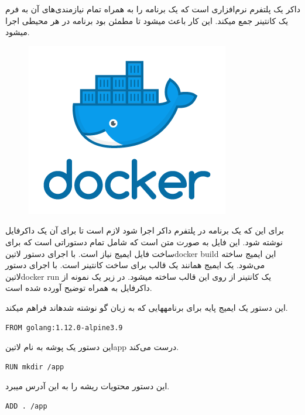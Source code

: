 \documentclass[a4]{report}
\begin{document}
داکر یک پلتفرم نرم‌افزاری است که یک برنامه را به همراه تمام نیازمندی‌های آن به فرم یک کانتینر جمع
میکند. این کار باعث میشود تا مطمئن بود برنامه در هر محیطی اجرا میشود.

\begin{figure}
\centering
\includegraphics[scale=0.25]{fig/docker}
\end{figure}

برای این که یک برنامه در پلتفرم داکر اجرا شود لازم است تا برای آن یک داکرفایل
نوشته شود. این فایل به صورت متن است که شامل تمام دستوراتی است که برای ساخت فایل ایمیج نیاز است. با اجرای دستور ‌لاتین{docker build} این ایمیج ساخته می‌شود. یک ایمیج همانند یک قالب برای ساخت کانتینر است. با اجرای دستور ‌لاتین{docker run} یک کانتینر از روی این قالب ساخته میشود.
در زیر یک نمونه از داکرفایل به همراه توضیح آورده شده است.


این دستور یک ایمیج پایه برای برنامههایی که به زبان گو نوشته شدهاند فراهم میکند.

\begin{latin}
\begin{verbatim}
FROM golang:1.12.0-alpine3.9
\end{verbatim}
\end{latin}

این دستور یک پوشه به نام ‌لاتین{app} درست می‌کند.

\begin{latin}
\begin{verbatim}
RUN mkdir /app
\end{verbatim}
\end{latin}

این دستور محتویات ریشه را به این آدرس میبرد.

\begin{latin}
\begin{verbatim}
ADD . /app
\end{verbatim}
\end{latin}
\end{document}
